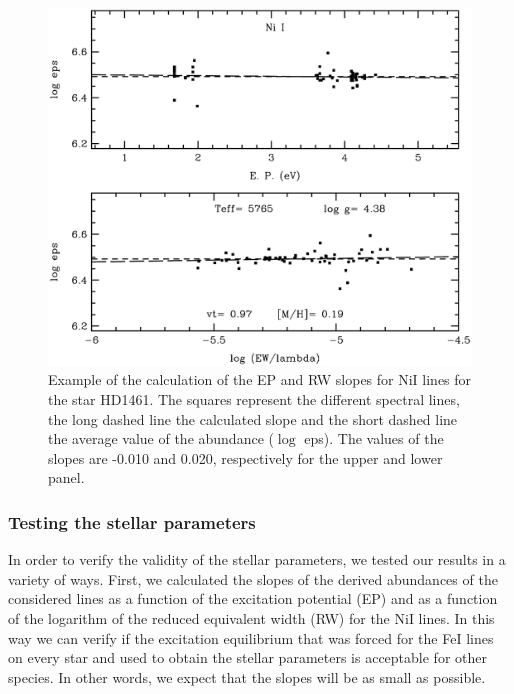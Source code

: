 \documentclass[oldversion]{aa}
\begin{document}
\begin{table}[t!]
\begin{tabular}{l c c r c c c c c c c c c}

\hline

\end{tabular}

\end{table}


\begin{figure}[t]
\centering
\includegraphics[trim=0mm 0mm 0mm 10mm, clip,width= 9 cm]{pics/moogpicniq.eps}
\caption[Example of the calculation for Ni of the EP and RW slopes]{Example of the calculation of the EP and RW slopes for NiI lines for the star HD1461. The squares represent the different spectral lines, the long dashed line the calculated slope and the short dashed line the average value of the abundance ($\log$ eps). The values of the slopes are -0.010 and 0.020, respectively for the upper and lower panel.}
\label{fig:exslope}
\end{figure}

\subsubsection{Testing the stellar parameters}
\label{sec:testing}

In order to verify the validity of the stellar parameters, we tested our results in a variety of ways. First, we calculated the slopes of the derived abundances of the considered lines as a function of the excitation potential (EP) and as a function of the logarithm of the reduced equivalent width (RW) for the NiI lines. In this way we can verify if the excitation equilibrium that was forced for the FeI lines on every star and used to obtain the stellar parameters \citep{Sousa-2008} is acceptable for other species. In other words, we expect that the slopes will be as small as possible. 
\end{document}
